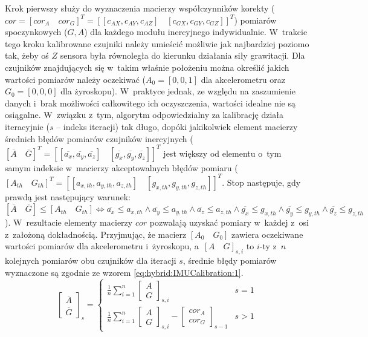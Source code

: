 Krok pierwszy służy do wyznaczenia macierzy współczynników korekty ($cor = [cor_A \quad cor_G]^T = [[c_{AX},c_{AY},c_{AZ}]\quad [c_{GX},c_{GY},c_{GZ}]]^T $) pomiarów spoczynkowych ($G, A$) dla każdego modułu inercyjnego indywidualnie. W~trakcie tego kroku kalibrowane czujniki należy umieścić możliwie jak najbardziej poziomo tak, żeby oś $Z$ sensora była równoległa do kierunku działania siły grawitacji. Dla czujników znajdujących się w~takim właśnie położeniu można określić jakich wartości pomiarów należy oczekiwać ($A_0 = [0,0,1]$ dla akcelerometru oraz $G_0 = [0,0,0]$ dla żyroskopu). W~praktyce jednak, ze względu na zaszumienie danych i~brak możliwości całkowitego ich oczyszczenia, wartości idealne nie są osiągalne. W~związku z~tym, algorytm odpowiedzialny za kalibrację działa iteracyjnie ($s$ -- indeks iteracji) tak długo, dopóki jakikolwiek element macierzy średnich błędów pomiarów czujników inercyjnych ($[\overline{A}\quad \overline{G}]^T = [[\overline{a_x},\overline{a_y},\overline{a_z}]\quad[\overline{g_x},\overline{g_y},\overline{g_z}]]^T$ jest większy od elementu o~tym samym indeksie w~macierzy akceptowalnych błędów pomiaru ($[A_{th}\quad G_{th}]^T = [[a_{x,th},a_{y,th},a_{z,th}]\quad[g_{x,th},g_{y,th},g_{z,th}]]^T $. Stop następuje, gdy prawdą jest następujący warunek: $[\overline{A}\quad \overline{G}] \leq [A_{th}\quad G_{th}] \Leftrightarrow \overline{a_x}\leq a_{x,th} \land \overline{a_y} \leq a_{y,th} \land \overline{a_z} \leq a_{z,th} \land \overline{g_x} \leq g_{x,th} \land \overline{g_y} \leq g_{y,th} \land \overline{g_z} \leq g_{z,th}$). W~rezultacie elementy macierzy $cor$ pozwalają uzyskać pomiary w~każdej z~osi z~założoną dokładnością. Przyjmując, że macierz $[A_0\quad G_0]$ zawiera oczekiwane wartości pomiarów dla akcelerometru i~żyroskopu, a~$[A\quad G]_{s,i}$ to $i$-ty z~$n$ kolejnych pomiarów obu czujników dla iteracji $s$, średnie błędy pomiarów wyznaczone są zgodnie ze wzorem \ref{eq:hybrid:IMUCalibration:1}.
\begin{equation}
	\begin{bmatrix} \overline{A} \\ \overline{G} \end{bmatrix}_s =
	\begin{cases}
		\frac{1}{n}\sum_{i=1}^{n}{\begin{bmatrix}A \\ G\end{bmatrix}_{s,i}} & s = 1\\
		\frac{1}{n}\sum_{i=1}^{n}{\begin{bmatrix}A \\ G\end{bmatrix}_{s,i} - \begin{bmatrix}cor_A\\ cor_G\end{bmatrix}_{s-1}} &  s > 1
	\end{cases}
	\label{eq:hybrid:IMUCalibration:1}
\end{equation}

